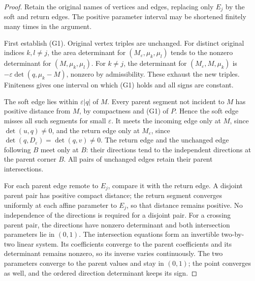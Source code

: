 \begin{proof}\leanok{}
Retain the original names of vertices and edges, replacing only
$E_j$ by the soft and return edges. The positive parameter interval
may be shortened finitely many times in the argument.

First establish (G1). Original vertex triples are unchanged.
For distinct original indices $k,l\ne j$, the area determinant for
$(M_\varepsilon,\mu_k,\mu_l)$ tends to the nonzero determinant
for $(M,\mu_k,\mu_l)$. For $k\ne j$, the determinant for
$(M_\varepsilon,M,\mu_k)$ is
$-\varepsilon\det(q,\mu_k-M)$, nonzero by admissibility.
These exhaust the new triples. Finiteness gives one interval
on which (G1) holds and all signs are constant.

The soft edge lies within $\varepsilon|q|$ of $M$.
Every parent segment not incident to $M$ has positive distance
from $M$, by compactness and (G1) of $P$. Hence the soft edge
misses all such segments for small $\varepsilon$. It meets the
incoming edge only at $M$, since $\det(u,q)\ne0$, and the return
edge only at $M_\varepsilon$, since
$\det(q,D_\varepsilon)=\det(q,v)\ne0$. The return edge and the
unchanged edge following $B$ meet only at $B$: their directions
tend to the independent directions at the parent corner $B$.
All pairs of unchanged edges retain their parent intersections.

For each parent edge remote to $E_j$, compare it with the return
edge. A disjoint parent pair has positive compact distance;
the return segment converges uniformly at each affine parameter
to $E_j$, so that distance remains positive. No independence
of the directions is required for a disjoint pair. For a crossing
parent pair, the directions have nonzero determinant and both
intersection parameters lie in $(0,1)$. The intersection equations
form an invertible two-by-two linear system. Its coefficients
converge to the parent coefficients and its determinant remains
nonzero, so its inverse varies continuously. The two parameters
converge to the parent values and stay in $(0,1)$; the point
converges as well, and the ordered direction determinant keeps
its sign.


\end{proof}

